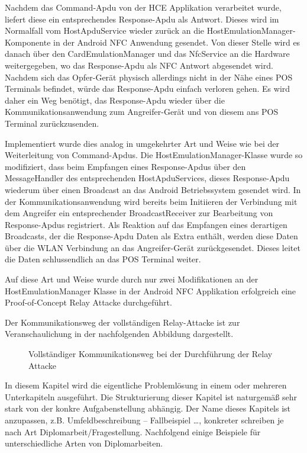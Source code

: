 Nachdem das Command-Apdu von der HCE Applikation verarbeitet wurde, liefert diese ein entsprechendes Response-Apdu als Antwort. Dieses wird im Normalfall vom HostApduService wieder zurück an die HostEmulationManager-Komponente in der Android NFC Anwendung gesendet. Von dieser Stelle wird es danach über den CardEmulationManager und das NfcService an die Hardware weitergegeben, wo das Response-Apdu als NFC Antwort abgesendet wird. Nachdem sich das Opfer-Gerät physisch allerdings nicht in der Nähe eines POS Terminals befindet, würde das Response-Apdu einfach verloren gehen. Es wird daher ein Weg benötigt, das Response-Apdu wieder über die Kommunikationsanwendung zum Angreifer-Gerät und von diesem ans POS Terminal zurückzusenden. 

Implementiert wurde dies analog in umgekehrter Art und Weise wie bei der Weiterleitung von Command-Apdus. Die HostEmulationManager-Klasse wurde so modifiziert, dass beim Empfangen eines Response-Apdus über den MessageHandler des entsprechenden HostApduServices, dieses Response-Apdu wiederum über einen Broadcast an das Android Betriebssystem gesendet wird. In der Kommunikationsanwendung wird bereits beim Initiieren der Verbindung mit dem Angreifer ein entsprechender BroadcastReceiver zur Bearbeitung von Response-Apdus registriert. Als Reaktion auf das Empfangen eines derartigen Broadcasts, der die Response-Apdu Daten als Extra enthält, werden diese Daten über die WLAN Verbindung an das Angreifer-Gerät zurückgesendet. Dieses leitet die Daten schlussendlich an das POS Terminal weiter. 

Auf diese Art und Weise wurde durch nur zwei Modifikationen an der HostEmulationManager Klasse in der Android NFC Applikation erfolgreich eine Proof-of-Concept Relay Attacke durchgeführt.

Der Kommunikationsweg der vollständigen Relay-Attacke ist zur Veranschaulichung in der nachfolgenden Abbildung dargestellt. 

\begin{figure}[h]
	\caption{Vollständiger Kommunikationsweg bei der Durchführung der Relay Attacke}
\end{figure}

In diesem Kapitel wird die eigentliche Problemlösung in einem oder mehreren Unterkapiteln ausgeführt. Die Strukturierung dieser Kapitel ist naturgemäß sehr stark von der konkre Aufgabenstellung abhängig. Der Name dieses Kapitels ist anzupassen, z.B. Umfeldbeschreibung -- Fallbeispiel \dots, konkreter schreiben je nach Art Diplomarbeit/Fragestellung.
\makeatletter\ifthesis@masterthesis
Nachfolgend einige Beispiele für unterschiedliche Arten von Diplomarbeiten.

